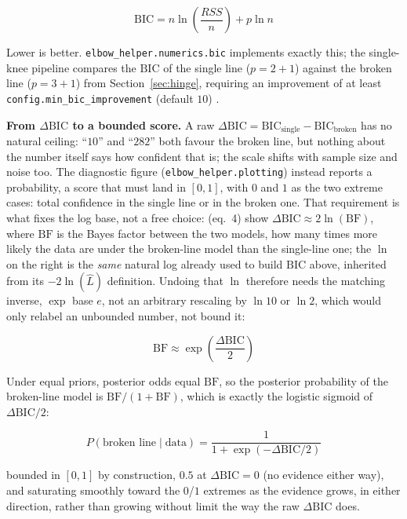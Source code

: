 \documentclass[11pt]{article}
\newcommand{\code}[1]{\texttt{#1}}
\begin{document}
\begin{equation}
\mathrm{BIC} = n \ln\!\left(\frac{RSS}{n}\right) + p \ln n
\end{equation}

Lower is better. \code{elbow\_helper.numerics.bic} implements exactly
this; the single-knee pipeline compares the $\mathrm{BIC}$ of the single
line ($p = 2 + 1$) against the broken line ($p = 3 + 1$) from Section~\ref{sec:hinge},
requiring an improvement of at least \code{config.min\_bic\_improvement}
(default $10$) \citep{schwarz1978} \citep{hastie2009esl} \citep{bishop2006prml}.

\textbf{From $\Delta\mathrm{BIC}$ to a bounded score.} A raw
$\Delta\mathrm{BIC} = \mathrm{BIC}_{\text{single}} -
\mathrm{BIC}_{\text{broken}}$ has no natural ceiling: ``$10$'' and
``$282$'' both favour the broken line, but nothing about the number itself
says how confident that is; the scale shifts with sample size and noise
too. The diagnostic figure (\code{elbow\_helper.plotting}) instead reports
a probability, a score that must land in $[0, 1]$, with $0$ and $1$ as the
two extreme cases: total confidence in the single line or in the broken
one. That requirement is what fixes the log base, not a free
choice: \citet{kassraftery1995} (eq.~4) show
$\Delta\mathrm{BIC} \approx 2 \ln(\mathrm{BF})$, where $\mathrm{BF}$ is the
Bayes factor between the two models, how many times more likely the
data are under the broken-line model than the single-line one; the $\ln$
on the right is the
\emph{same} natural log already used to build $\mathrm{BIC}$ above,
inherited from its $-2\ln(\hat L)$ definition. Undoing that $\ln$ therefore
needs the matching inverse, $\exp$ base $e$, not an arbitrary rescaling by
$\ln 10$ or $\ln 2$, which would only relabel an unbounded number, not
bound it:

\begin{equation}
\mathrm{BF} \approx \exp\!\left(\frac{\Delta\mathrm{BIC}}{2}\right)
\end{equation}

Under equal priors, posterior odds equal $\mathrm{BF}$, so the posterior
probability of the broken-line model is $\mathrm{BF} / (1 + \mathrm{BF})$,
which is exactly the logistic sigmoid of $\Delta\mathrm{BIC} / 2$:

\begin{equation}
P(\text{broken line} \mid \text{data}) = \frac{1}{1 + \exp(-\Delta\mathrm{BIC}/2)}
\end{equation}

bounded in $[0, 1]$ by construction, $0.5$ at $\Delta\mathrm{BIC} = 0$ (no
evidence either way), and saturating smoothly toward the $0$/$1$ extremes
as the evidence grows, in either direction, rather than growing without
limit the way the raw $\Delta\mathrm{BIC}$ does.
\end{document}
